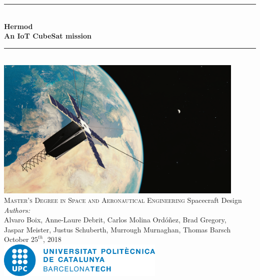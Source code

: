 
\begin{titlepage}

\newcommand{\HRule}{\rule{\linewidth}{0.5mm}} %

\center %


\HRule \\[0.2cm]
{ \Huge \bfseries
Hermod\\
\normalsize An IoT CubeSat mission\\
}
\HRule \\[0.8cm]

\includegraphics[width=0.9\textwidth]{img/Cubesat_over_europe.png}\\[1cm]

\textsc{\large Master's Degree in Space and Aeronautical Engineering}
\large Spacecraft Design\\[0.4cm]

{ \textit{Authors:}\\
\normalsize Alvaro Boix,
Anne-Laure Debrit,
Carlos Molina Ordóñez,
Brad Gregory,\\
Jaspar Meister,
Justus Schuberth,
Murrough Murnaghan,
Thomas Barsch}\\[0.7cm]

{\normalsize October $25^{th}$, 2018}\\[1.2cm] %

\includegraphics[width=0.6\textwidth]{img/UPC_logo.jpg}\\[0.4cm]


\vfill %

\end{titlepage}
